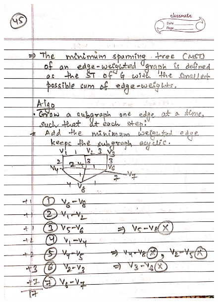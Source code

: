 \begin{figure}[H]
    \centering
    \includegraphics[width=16cm, height=21cm]{"./MIT-6.042J/MIT-6042J-045"}
\end{figure}
\newpage
